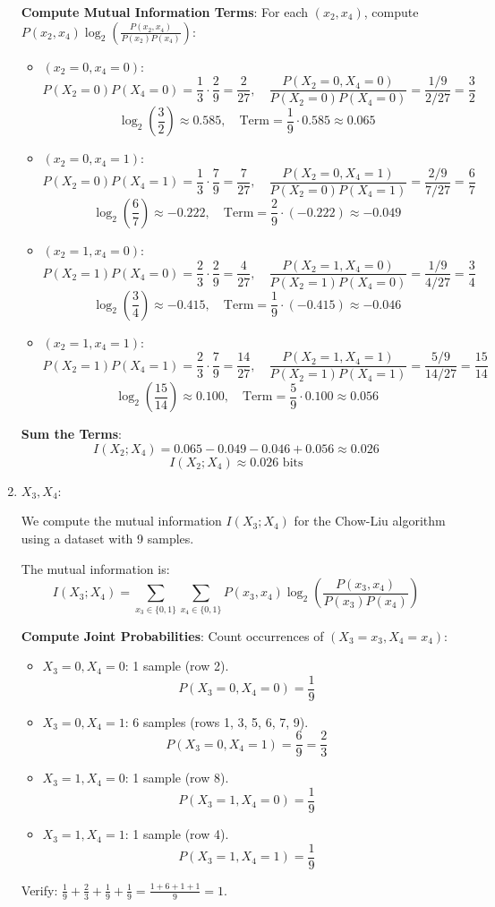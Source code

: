 \documentclass[a3paper,12pt]{extarticle} %
\begin{document}
\begin{enumerate}
\textbf{Compute Mutual Information Terms}:
For each \((x_2, x_4)\), compute \(P(x_2, x_4) \log_2 \left( \frac{P(x_2, x_4)}{P(x_2)P(x_4)} \right)\):
\begin{itemize}
    \item \((x_2 = 0, x_4 = 0)\):
    \[
    P(X_2 = 0)P(X_4 = 0) = \frac{1}{3} \cdot \frac{2}{9} = \frac{2}{27}, \quad \frac{P(X_2 = 0, X_4 = 0)}{P(X_2 = 0)P(X_4 = 0)} = \frac{1/9}{2/27} = \frac{3}{2}
    \]
    \[
    \log_2 \left( \frac{3}{2} \right) \approx 0.585, \quad \text{Term} = \frac{1}{9} \cdot 0.585 \approx 0.065
    \]
    \item \((x_2 = 0, x_4 = 1)\):
    \[
    P(X_2 = 0)P(X_4 = 1) = \frac{1}{3} \cdot \frac{7}{9} = \frac{7}{27}, \quad \frac{P(X_2 = 0, X_4 = 1)}{P(X_2 = 0)P(X_4 = 1)} = \frac{2/9}{7/27} = \frac{6}{7}
    \]
    \[
    \log_2 \left( \frac{6}{7} \right) \approx -0.222, \quad \text{Term} = \frac{2}{9} \cdot (-0.222) \approx -0.049
    \]
    \item \((x_2 = 1, x_4 = 0)\):
    \[
    P(X_2 = 1)P(X_4 = 0) = \frac{2}{3} \cdot \frac{2}{9} = \frac{4}{27}, \quad \frac{P(X_2 = 1, X_4 = 0)}{P(X_2 = 1)P(X_4 = 0)} = \frac{1/9}{4/27} = \frac{3}{4}
    \]
    \[
    \log_2 \left( \frac{3}{4} \right) \approx -0.415, \quad \text{Term} = \frac{1}{9} \cdot (-0.415) \approx -0.046
    \]
    \item \((x_2 = 1, x_4 = 1)\):
    \[
    P(X_2 = 1)P(X_4 = 1) = \frac{2}{3} \cdot \frac{7}{9} = \frac{14}{27}, \quad \frac{P(X_2 = 1, X_4 = 1)}{P(X_2 = 1)P(X_4 = 1)} = \frac{5/9}{14/27} = \frac{15}{14}
    \]
    \[
    \log_2 \left( \frac{15}{14} \right) \approx 0.100, \quad \text{Term} = \frac{5}{9} \cdot 0.100 \approx 0.056
    \]
\end{itemize}

\textbf{Sum the Terms}:
\[
I(X_2; X_4) = 0.065 - 0.049 - 0.046 + 0.056 \approx 0.026
\]
\[
I(X_2; X_4) \approx 0.026 \text{ bits}
\]
\item \(X_3, X_4\):

We compute the mutual information \(I(X_3; X_4)\) for the Chow-Liu algorithm using a dataset with 9 samples.

The mutual information is:
\[
I(X_3; X_4) = \sum_{x_3 \in \{0,1\}} \sum_{x_4 \in \{0,1\}} P(x_3, x_4) \log_2 \left( \frac{P(x_3, x_4)}{P(x_3)P(x_4)} \right)
\]

\textbf{Compute Joint Probabilities}: Count occurrences of \((X_3 = x_3, X_4 = x_4)\):
\begin{itemize}
    \item \(X_3 = 0, X_4 = 0\): 1 sample (row 2).
    \[
    P(X_3 = 0, X_4 = 0) = \frac{1}{9}
    \]
    \item \(X_3 = 0, X_4 = 1\): 6 samples (rows 1, 3, 5, 6, 7, 9).
    \[
    P(X_3 = 0, X_4 = 1) = \frac{6}{9} = \frac{2}{3}
    \]
    \item \(X_3 = 1, X_4 = 0\): 1 sample (row 8).
    \[
    P(X_3 = 1, X_4 = 0) = \frac{1}{9}
    \]
    \item \(X_3 = 1, X_4 = 1\): 1 sample (row 4).
    \[
    P(X_3 = 1, X_4 = 1) = \frac{1}{9}
    \]
\end{itemize}
Verify: \(\frac{1}{9} + \frac{2}{3} + \frac{1}{9} + \frac{1}{9} = \frac{1 + 6 + 1 + 1}{9} = 1\).


\end{enumerate}
\end{document}
